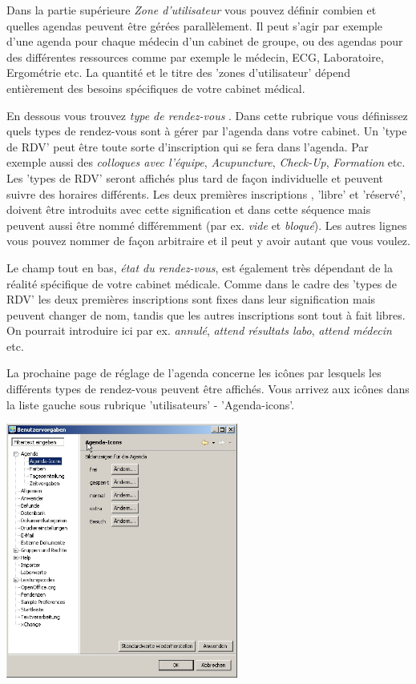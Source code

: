Dans la partie supérieure  \textit{Zone d'utilisateur}  vous pouvez définir combien et quelles agendas peuvent être gérées parallèlement. Il peut s'agir par exemple d'une agenda pour chaque médecin d'un
 cabinet de groupe, ou des agendas pour des différentes ressources comme par exemple le médecin, ECG, Laboratoire, Ergométrie etc.
La quantité et le titre des 'zones d'utilisateur' dépend entièrement des besoins spécifiques de votre cabinet médical.

En dessous vous trouvez \textit{type de rendez-vous} . Dans cette rubrique vous définissez quels types de rendez-vous sont à gérer par l'agenda dans votre cabinet. Un 'type de RDV' peut être toute sorte d'inscription qui se fera dans l'agenda. Par exemple aussi des  \textit{colloques avec l'équipe},  \textit{Acupuncture},  \textit{Check-Up},  \textit{Formation}  etc. Les 'types de RDV' seront affichés plus tard de façon individuelle et peuvent suivre des horaires différents.  Les deux premières inscriptions , 'libre' et 'réservé', doivent être introduits avec cette signification et dans cette séquence mais peuvent aussi être nommé différemment (par ex. \textit{vide}  et \textit{bloqué}). Les autres lignes vous pouvez nommer de façon arbitraire et il peut y avoir autant que vous voulez.

Le champ tout en bas, \textit{état du rendez-vous}, est également très dépendant de la réalité spécifique de votre cabinet médicale. Comme dans le cadre des 'types de RDV' les deux premières inscriptions sont fixes dans leur signification mais peuvent changer de nom, tandis que les autres inscriptions sont tout à fait libres. On pourrait introduire ici par ex.   \textit{annulé}, \textit{attend résultats labo}, \textit{attend médecin}  etc.

La prochaine page de réglage de l'agenda concerne les icônes  par lesquels les différents types de rendez-vous peuvent être affichés. Vous arrivez aux icônes dans la liste gauche sous rubrique 'utilisateurs' - 'Agenda-icons'.

\includegraphics[width=3in]{images/settings2}

